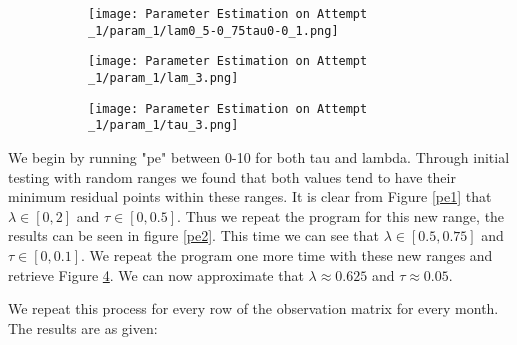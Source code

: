 \begin{figure}
    \begin{subfigure}{.8\textwidth}
      \centering
      \texttt{[image: Parameter Estimation on Attempt \_1/param\_1/lam0\_5-0\_75tau0-0\_1.png]}
      \caption{}
      \label{pe3:1}
    \end{subfigure}

    \begin{subfigure}{.45\textwidth}
      \centering
      \texttt{[image: Parameter Estimation on Attempt \_1/param\_1/lam\_3.png]}
      \caption{}
      \label{pe3:2}
    \end{subfigure}
    \begin{subfigure}{.45\textwidth}
      \centering
      \texttt{[image: Parameter Estimation on Attempt \_1/param\_1/tau\_3.png]}
      \caption{}
      \label{pe3:3}
    \end{subfigure}
    \caption{}
    \label{pe3}
\end{figure}

We begin by running "pe" between 0-10 for both tau and lambda. Through initial testing with random ranges we found that both values tend to have their minimum residual points within these ranges. It is clear from Figure \ref{pe1} that $\lambda \in [0,2]$ and $\tau \in [0,0.5]$. Thus we repeat the program for this new range, the results can be seen in figure \ref{pe2}. This time we can see that $\lambda \in [0.5,0.75]$ and $\tau \in [0,0.1]$. We repeat the program one more time with these new ranges and retrieve Figure \ref{pe3}. We can now approximate that $\lambda \approx 0.625$ and $\tau \approx 0.05$. 

We repeat this process for every row of the observation matrix for every month. The results are as given:

